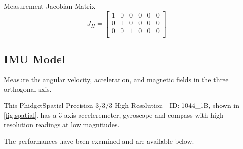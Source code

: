 Measurement Jacobian Matrix
\begin{equation}
J_H
=
\begin{bmatrix}
1 & 0 & 0 & 0 & 0 & 0 \\
0 & 1 & 0 & 0 & 0 & 0 \\
0 & 0 & 1 & 0 & 0 & 0 \\
\end{bmatrix}
\end{equation}



\subsection{IMU Model}


\noindent Measure the angular velocity, acceleration, and magnetic fields in the three orthogonal axis.

This PhidgetSpatial Precision 3/3/3 High Resolution - ID: 1044\_1B, shown in \ref{fig:spatial}, has a 3-axis accelerometer, gyroscope and compass with high resolution readings at low magnitudes.

The performances have been examined and are available below.

